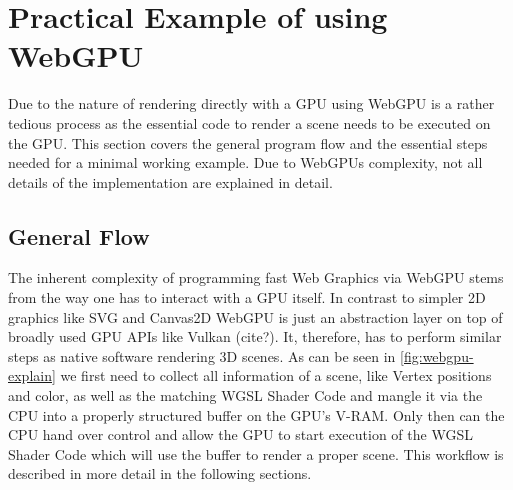 %
%
% 
% 

\newcommand*{\codesnippet}[4]{
  \inputminted[
    frame=lines,
    framesep=2mm,
    baselinestretch=1.2,
    linenos,
    fontsize=\scriptsize,
    firstline=#1,
    lastline=#2
  ]{#3}{#4}}


\newcommand*{\code}[1]{
  \inputminted[
    frame=lines,
    framesep=2mm,
    baselinestretch=1.2,
    linenos,
    fontsize=\scriptsize,
    breaklines=true,
    highlightlines={30-33,42-49}
  ]{typescript}{#1}}


\chapter{Practical Example of using WebGPU}

\label{chap:PracticalExample}

Due to the nature of rendering directly with a GPU using WebGPU is a rather tedious process as the essential code to render a scene needs to be executed on the GPU.
This section covers the general program flow and the essential steps needed for a minimal working example. Due to WebGPUs complexity, not all details of the implementation are explained in detail. 


\section{General Flow}

The inherent complexity of programming fast Web Graphics via WebGPU stems from the way one has to interact with a GPU itself.
In contrast to simpler 2D graphics like SVG and Canvas2D WebGPU is just an abstraction layer on top of broadly used GPU APIs like Vulkan (cite?).
It, therefore, has to perform similar steps as native software rendering 3D scenes. As can be seen in \ref*{fig:webgpu-explain} we first need to
collect all information of a scene, like Vertex positions and color, as well as the matching WGSL Shader Code and mangle it via the CPU into a properly structured
buffer on the GPU's V-RAM. Only then can the CPU hand over control and allow the GPU to start execution of the WGSL Shader Code which will use the buffer to render a proper scene.
This workflow is described in more detail in the following sections.


